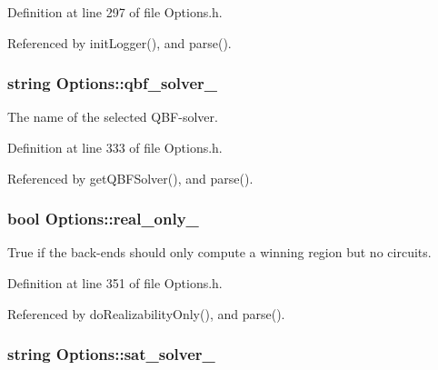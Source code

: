 Definition at line 297 of file Options.\-h.



Referenced by init\-Logger(), and parse().

\hypertarget{classOptions_a07391a51f78315a8e8d2ecbeb8f57ddd}{
\subsubsection[{qbf\-\_\-solver\-\_\-}]{\setlength{\rightskip}{0pt plus 5cm}string Options\-::qbf\-\_\-solver\-\_\-\hspace{0.3cm}{\ttfamily [protected]}}}\label{classOptions_a07391a51f78315a8e8d2ecbeb8f57ddd}


The name of the selected Q\-B\-F-\/solver. 



Definition at line 333 of file Options.\-h.



Referenced by get\-Q\-B\-F\-Solver(), and parse().

\hypertarget{classOptions_a2e3668079f6c62e087edd486d19bf84a}{
\subsubsection[{real\-\_\-only\-\_\-}]{\setlength{\rightskip}{0pt plus 5cm}bool Options\-::real\-\_\-only\-\_\-\hspace{0.3cm}{\ttfamily [protected]}}}\label{classOptions_a2e3668079f6c62e087edd486d19bf84a}


True if the back-\/ends should only compute a winning region but no circuits. 



Definition at line 351 of file Options.\-h.



Referenced by do\-Realizability\-Only(), and parse().

\hypertarget{classOptions_af68f26928f23fda3bdc75c4b43ae17bc}{
\subsubsection[{sat\-\_\-solver\-\_\-}]{\setlength{\rightskip}{0pt plus 5cm}string Options\-::sat\-\_\-solver\-\_\-\hspace{0.3cm}{\ttfamily [protected]}}}\label{classOptions_af68f26928f23fda3bdc75c4b43ae17bc}


